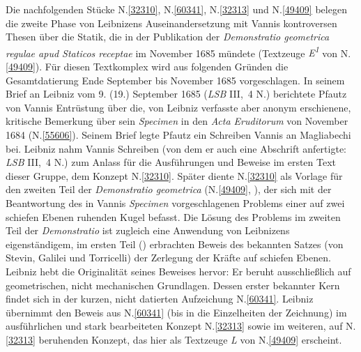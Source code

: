 \begin{ledgroup}
\footnotesize
\pstart
\noindent
Die nachfolgenden Stücke N.\;\ref{32310}, N.\;\ref{60341}, N.\;\ref{32313} und N.\;\ref{49409}
belegen die zweite Phase von Leibnizens Auseinandersetzung mit Vannis kontroversen Thesen über die Statik,
die in der Publikation der \textit{Demonstratio geometrica regulae apud Staticos receptae} im November 1685 mündete (Textzeuge \textit{E\textsuperscript{1}} von N.\;\ref{49409}).
Für diesen Textkomplex wird aus folgenden Gründen die Gesamtdatierung Ende September bis November 1685 vorgeschlagen.
\pend
\pstart
In seinem \cite{02009}Brief an Leibniz vom 9. (19.) September 1685 (\textit{LSB} III,~4 N.) berichtete 
Pfautz 
von Vannis Entrüstung über die,
von Leibniz verfasste aber anonym erschienene,
kritische Bemerkung über sein \cite{01995}\textit{Specimen}
in den \textit{Acta Eruditorum} von November 1684 (N.\;\ref{55606}).
Seinem Brief legte Pfautz
ein \cite{02010}Schreiben 
Vannis an 
Magliabechi bei.
Leibniz nahm Vannis Schreiben (von dem er auch eine \cite{02010}Abschrift anfertigte: \textit{LSB} III,~4 N.) zum Anlass für
die Ausführungen und Beweise im ersten Text dieser Gruppe, dem Konzept N.\;\ref{32310}.
Später diente N.\;\ref{32310} als Vorlage für den zweiten Teil der \textit{Demonstratio geometrica} (N.\;\ref{49409}, ), der sich mit der Beantwortung des in Vannis \textit{Specimen} vorgeschlagenen Problems einer auf zwei schiefen Ebenen ruhenden Kugel befasst.
\pend
\pstart
Die Lösung des Problems im zweiten Teil der \textit{Demonstratio} ist zugleich eine Anwendung von Leibnizens eigenständigem, im ersten Teil () erbrachten Beweis des bekannten Satzes (von Stevin, Galilei und Torricelli) der Zerlegung der Kräfte auf schiefen Ebenen.
Leibniz hebt die Originalität seines Beweises hervor: Er beruht ausschließlich auf geometrischen, nicht mechanischen Grundlagen.
Dessen erster bekannter Kern findet sich in der kurzen, nicht datierten Aufzeichung N.\;\ref{60341}. 
Leibniz übernimmt den Beweis aus N.\;\ref{60341} (bis in die Einzelheiten der Zeichnung) im ausführlichen und stark bearbeiteten Konzept N.\;\ref{32313} sowie im weiteren, auf N.\;\ref{32313} beruhenden Konzept, das hier als Textzeuge \textit{L} von N.\;\ref{49409} erscheint.

\end{ledgroup}
